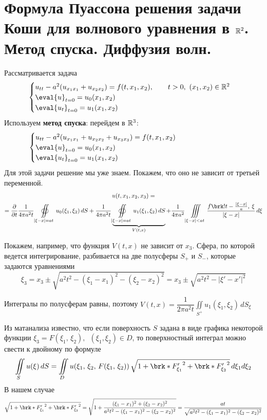 \documentclass[../main.tex]{subfiles}
\begin{document}
\section[Волновое уравнение в \texorpdfstring{$\R^2$}{R\textasciicircum 2}]{Формула Пуассона решения задачи Коши для волнового уравнения в $\R^2$. Метод спуска. Диффузия волн.}
Рассматривается задача
\begin{equation}
\label{eq::7::cauchy}
\begin{cases}
  u_{tt}-a^2(u_{x_1x_1}+u_{x_2x_2})=f(t,x_1,x_2),\qquad t>0,\ (x_1, x_2)\in \R^2\\
  \eval{u}_{t=0}=u_0(x_1, x_2)\\ 
  \eval{u_t}_{t=0}=u_1(x_1, x_2)
\end{cases}
\end{equation}
Используем \textbf{метод спуска}: перейдем в $\mathbb{R}^3$:
\begin{equation*}
\begin{cases}
  u_{tt}-a^2(u_{x_1x_1}+u_{x_2x_2}+u_{x_3x_3})=f(t,x_1,x_2) \hspace{7.5em}\\
  \eval{u}_{t=0}=u_0(x_1, x_2)\\
  \eval{u_t}_{t=0}=u_1(x_1, x_2)
\end{cases}
\end{equation*}
Для этой задачи решение мы уже знаем. Покажем, что оно не зависит от третьей переменной.
\begin{multline*}
u(t, x_1, x_2, x_3) = \\
= \pd{}{t} \frac{1}{4\pi a^2t} \oiint\limits_{|\xi-x|=at} u_0(\xi_1, \xi_2)\, dS 
+\frac{1}{4\pi a^2t}\underbrace{\oiint\limits_{|\xi-x|=at} u_1(\xi_1, \xi_2)\, dS}_{V(t,x)}
+\frac{1}{4\pi a^2}\iiint\limits_{|\xi - x|<at}\frac{f \brk!{t-\frac{|\xi - x|}{a},\: \xi} }{|\xi - x|}\, d\xi
\end{multline*}

Покажем, например, что функция $V(t,x)$ не зависит от $x_3$. Сфера, по которой ведется интегрирование, разбивается на две полусферы $S_+$ и $S_-$, которые задаются уравнениями
$$\xi_3=x_3\pm \sqrt{a^2t^2-(\xi_1 -x_1)^2-(\xi_2 -x_2)^2}=x_3\pm \sqrt{a^2t^2-|\xi '-x'|^2}$$

Интегралы по полусферам равны, поэтому $V(t,x)=\dfrac{1}{2\pi a^2t}\displaystyle\iint\limits_{S^+}u_1(\xi_1, \xi_2)\, dS_{\xi}$

Из матанализа известно, что если поверхность $S$ задана в виде графика некоторой функции $\xi_3=F(\xi_1,\, \xi_2),\;\ (\xi_1, \xi_2)\in D$, то поверхностный интеграл можно свести к двойному по формуле
\[
\iint\limits_S u(\xi )\, dS = \iint\limits_D u(\xi_1,\, \xi_2,\, F(\xi_1,\, \xi_2))\, 
\sqrt{1 + \brk*{F'_{\xi_1}}^2 + \brk*{F'_{\xi_2}}^2}\, d\xi_1 d\xi_2
\]
В нашем случае 
$$
\sqrt{1 + \brk*{F'_{\xi_1}}^2 + \brk*{F'_{\xi_2}}^2}
=\sqrt{1+\dfrac{(\xi_1 - x_1)^2+(\xi_2 - x_2)^2}{a^2t^2 - (\xi_1 - x_1)^2-(\xi_2 - x_2)^2}}
=\dfrac{at}{\sqrt{a^2t^2 - (\xi_1 - x_1)^2-(\xi_2 - x_2)^2}}$$
\end{document}

